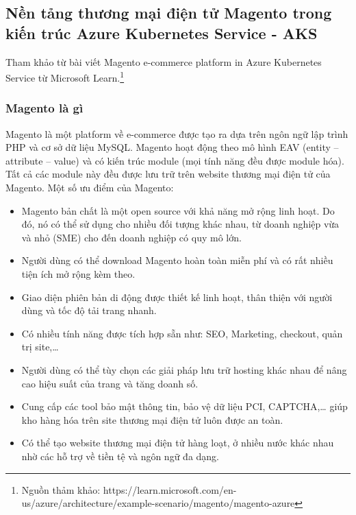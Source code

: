 \subsection{Nền tảng thương mại điện tử Magento trong kiến trúc Azure Kubernetes Service - AKS}
\noindent Tham khảo từ bài viết Magento e-commerce platform in Azure Kubernetes Service từ Microsoft Learn.\footnote{Nguồn thảm khảo: https://learn.microsoft.com/en-us/azure/architecture/example-scenario/magento/magento-azure}
\subsubsection{Magento là gì}
Magento là một platform về e-commerce được tạo ra dựa trên ngôn ngữ lập trình PHP và cơ sở dữ liệu MySQL. Magento hoạt động theo mô hình EAV (entity – attribute – value) và có kiến trúc module (mọi tính năng đều được module hóa). Tất cả các module này đều được lưu trữ trên website thương mại điện tử của Magento.
\newline
Một số ưu điểm của Magento:
    \begin{itemize}
        \item Magento bản chất là một open source với khả năng mở rộng linh hoạt. Do đó, nó có thể sử dụng cho nhiều đối tượng khác nhau, từ doanh nghiệp vừa và nhỏ (SME) cho đến doanh nghiệp có quy mô lớn.
        \item Người dùng có thể download Magento hoàn toàn miễn phí và có rất nhiều tiện ích mở rộng kèm theo.
        \item Giao diện phiên bản di động được thiết kế linh hoạt, thân thiện với người dùng và tốc độ tải trang nhanh.
        \item Có nhiều tính năng được tích hợp sẵn như: SEO, Marketing, checkout, quản trị site,…
        \item Người dùng có thể tùy chọn các giải pháp lưu trữ hosting khác nhau để nâng cao hiệu suất của trang và tăng doanh số.
        \item Cung cấp các tool bảo mật thông tin, bảo vệ dữ liệu PCI, CAPTCHA,… giúp kho hàng hóa trên site thương mại điện tử luôn được an toàn.
        \item Có thể tạo website thương mại điện tử hàng loạt, ở nhiều nước khác nhau nhờ các hỗ trợ về tiền tệ và ngôn ngữ đa dạng.    
    \end{itemize}
